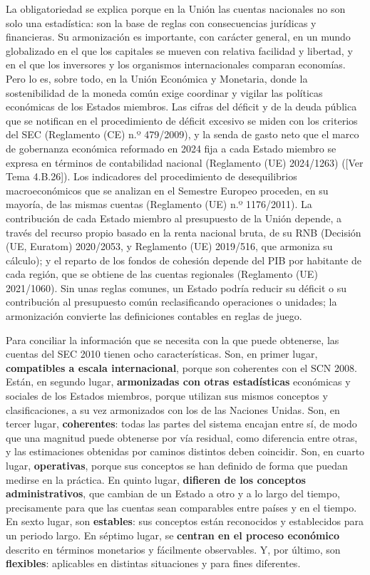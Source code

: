 \documentclass[10pt,a4paper]{article}
\newcommand{\authorfont}[1]{{\fontfamily{EBGaramond-TLF}\selectfont #1}}
\begin{document}
La obligatoriedad se explica porque en la Unión las cuentas nacionales no son solo una estadística: son la base de reglas con consecuencias jurídicas y financieras. Su armonización es importante, con carácter general, en un mundo globalizado en el que los capitales se mueven con relativa facilidad y libertad, y en el que los inversores y los organismos internacionales comparan economías. Pero lo es, sobre todo, en la Unión Económica y Monetaria, donde la sostenibilidad de la moneda común exige coordinar y vigilar las políticas económicas de los Estados miembros. Las cifras del déficit y de la deuda pública que se notifican en el procedimiento de déficit excesivo se miden con los criterios del SEC (Reglamento (CE) n.º 479/2009), y la senda de gasto neto que el marco de gobernanza económica reformado en 2024 fija a cada Estado miembro se expresa en términos de contabilidad nacional (Reglamento (UE) 2024/1263) ([\authorfont{Ver Tema 4.B.26}]). Los indicadores del procedimiento de desequilibrios macroeconómicos que se analizan en el Semestre Europeo proceden, en su mayoría, de las mismas cuentas (Reglamento (UE) n.º 1176/2011). La contribución de cada Estado miembro al presupuesto de la Unión depende, a través del recurso propio basado en la renta nacional bruta, de su RNB (Decisión (UE, Euratom) 2020/2053, y Reglamento (UE) 2019/516, que armoniza su cálculo); y el reparto de los fondos de cohesión depende del PIB por habitante de cada región, que se obtiene de las cuentas regionales (Reglamento (UE) 2021/1060). Sin unas reglas comunes, un Estado podría reducir su déficit o su contribución al presupuesto común reclasificando operaciones o unidades; la armonización convierte las definiciones contables en reglas de juego.

Para conciliar la información que se necesita con la que puede obtenerse, las cuentas del SEC 2010 tienen ocho características. Son, en primer lugar, \textbf{compatibles a escala internacional}, porque son coherentes con el SCN 2008. Están, en segundo lugar, \textbf{armonizadas con otras estadísticas} económicas y sociales de los Estados miembros, porque utilizan sus mismos conceptos y clasificaciones, a su vez armonizados con los de las Naciones Unidas. Son, en tercer lugar, \textbf{coherentes}: todas las partes del sistema encajan entre sí, de modo que una magnitud puede obtenerse por vía residual, como diferencia entre otras, y las estimaciones obtenidas por caminos distintos deben coincidir. Son, en cuarto lugar, \textbf{operativas}, porque sus conceptos se han definido de forma que puedan medirse en la práctica. En quinto lugar, \textbf{difieren de los conceptos administrativos}, que cambian de un Estado a otro y a lo largo del tiempo, precisamente para que las cuentas sean comparables entre países y en el tiempo. En sexto lugar, son \textbf{estables}: sus conceptos están reconocidos y establecidos para un periodo largo. En séptimo lugar, se \textbf{centran en el proceso económico} descrito en términos monetarios y fácilmente observables. Y, por último, son \textbf{flexibles}: aplicables en distintas situaciones y para fines diferentes.
\end{document}
